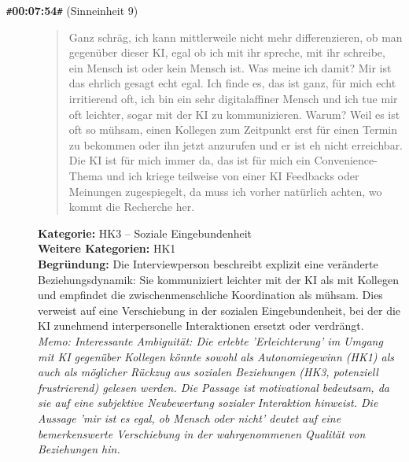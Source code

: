 \begin{description}
  \item[\texttt{\#}\textbf{00:07:54}\texttt{\#} (Sinneinheit 9)]
  \begin{quote}
  Ganz schräg, ich kann mittlerweile nicht mehr differenzieren, ob man gegenüber dieser KI, egal ob ich mit ihr spreche, mit ihr schreibe, ein Mensch ist oder kein Mensch ist. Was meine ich damit? Mir ist das ehrlich gesagt echt egal. Ich finde es, das ist ganz, für mich echt irritierend oft, ich bin ein sehr digitalaffiner Mensch und ich tue mir oft leichter, sogar mit der KI zu kommunizieren. Warum? Weil es ist oft so mühsam, einen Kollegen zum Zeitpunkt erst für einen Termin zu bekommen oder ihn jetzt anzurufen und er ist eh nicht erreichbar. Die KI ist für mich immer da, das ist für mich ein Convenience-Thema und ich kriege teilweise von einer KI Feedbacks oder Meinungen zugespiegelt, da muss ich vorher natürlich achten, wo kommt die Recherche her.
  \end{quote}
  \textbf{Kategorie:} HK3 -- Soziale Eingebundenheit\\
  \textbf{Weitere Kategorien:} HK1\\
  \textbf{Begr\"undung:} Die Interviewperson beschreibt explizit eine veränderte Beziehungsdynamik: Sie kommuniziert leichter mit der KI als mit Kollegen und empfindet die zwischenmenschliche Koordination als mühsam. Dies verweist auf eine Verschiebung in der sozialen Eingebundenheit, bei der die KI zunehmend interpersonelle Interaktionen ersetzt oder verdrängt.
  \\\textit{Memo: Interessante Ambiguität: Die erlebte 'Erleichterung' im Umgang mit KI gegenüber Kollegen könnte sowohl als Autonomiegewinn (HK1) als auch als möglicher Rückzug aus sozialen Beziehungen (HK3, potenziell frustrierend) gelesen werden. Die Passage ist motivational bedeutsam, da sie auf eine subjektive Neubewertung sozialer Interaktion hinweist. Die Aussage 'mir ist es egal, ob Mensch oder nicht' deutet auf eine bemerkenswerte Verschiebung in der wahrgenommenen Qualität von Beziehungen hin.}
\end{description}
\medskip

